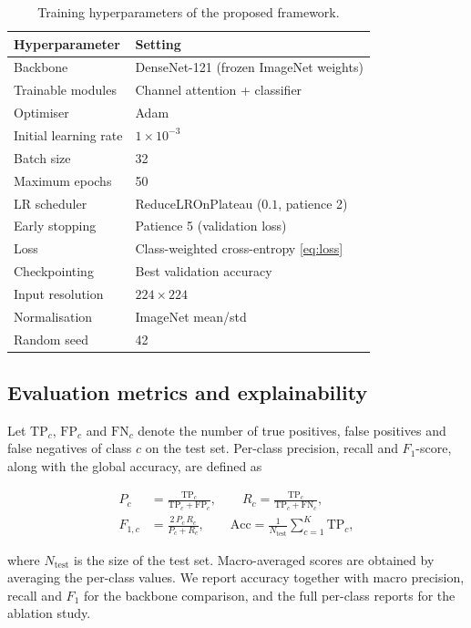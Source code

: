 \documentclass[a4paper,fleqn]{cas-dc}
\begin{document}
\begin{table}[t]
\small
\rmfamily
\caption{Training hyperparameters of the proposed framework.}
\label{tbl:hyperparams}
\begin{tabular*}{\tblwidth}{@{\extracolsep{\fill}} ll @{}}
\toprule
Hyperparameter & Setting\\
\midrule
Backbone & DenseNet-121 (frozen ImageNet weights)\\
Trainable modules & Channel attention + classifier\\
Optimiser & Adam\\
Initial learning rate & $1\times10^{-3}$\\
Batch size & 32\\
Maximum epochs & 50\\
LR scheduler & ReduceLROnPlateau ($0.1$, patience 2)\\
Early stopping & Patience 5 (validation loss)\\
Loss & Class-weighted cross-entropy \eqref{eq:loss}\\
Checkpointing & Best validation accuracy\\
Input resolution & $224\times224$\\
Normalisation & ImageNet mean/std\\
Random seed & 42\\
\bottomrule
\end{tabular*}
\end{table}

\subsection{Evaluation metrics and explainability}\label{sec:evaluation}

Let $\mathrm{TP}_c$, $\mathrm{FP}_c$ and $\mathrm{FN}_c$ denote the number of
true positives, false positives and false negatives of class $c$ on the test
set. Per-class precision, recall and $F_1$-score, along with the global
accuracy, are defined as

\begin{align}
  P_c &= \frac{\mathrm{TP}_c}{\mathrm{TP}_c + \mathrm{FP}_c},
  \qquad R_c = \frac{\mathrm{TP}_c}{\mathrm{TP}_c + \mathrm{FN}_c},\\
  F_{1,c} &= \frac{2\, P_c\, R_c}{P_c + R_c},
  \qquad \mathrm{Acc} = \frac{1}{N_{\text{test}}}\sum_{c=1}^{K} \mathrm{TP}_c,
\end{align}

where $N_{\text{test}}$ is the size of the test set. Macro-averaged scores
are obtained by averaging the per-class values. We report accuracy together
with macro precision, recall and $F_1$ for the backbone comparison, and the
full per-class reports for the ablation study.
\end{document}
